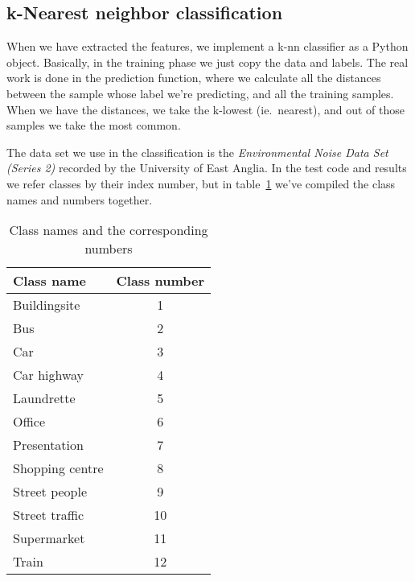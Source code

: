 \subsection{k-Nearest neighbor classification}

When we have extracted the features, we implement a k-nn classifier as a Python
object. Basically, in the training phase we just copy the data and labels. The
real work is done in the prediction function, where we calculate all the
distances between the sample whose label we're predicting, and all the training
samples. When we have the distances, we take the k-lowest (ie.\ nearest), and
out of those samples we take the most common.

The data set we use in the classification is the \textit{Environmental Noise
Data Set (Series 2)} recorded by the University of East Anglia. In the test
code and results we refer classes by their index number, but in
table~\ref{tab:classes} we've compiled the class names and numbers together.
\begin{table}
  \centering
  \caption{Class names and the corresponding numbers}
  \begin{tabular}{lc}  
    \toprule
    \cmidrule(r){1-2}
    Class name    & Class number \\
    \midrule

    Buildingsite & 1   \\
    Bus & 2   \\
    Car & 3   \\
    Car highway & 4   \\
    Laundrette & 5   \\
    Office & 6   \\
    Presentation & 7   \\
    Shopping centre & 8   \\
    Street people & 9   \\
    Street traffic & 10   \\
    Supermarket & 11   \\
    Train & 12   \\

    \bottomrule
  \end{tabular}
\label{tab:classes}
\end{table}


